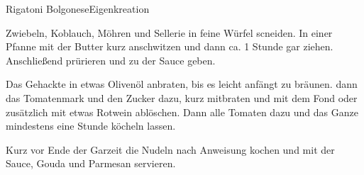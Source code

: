 \begin{recipe}{Rigatoni Bolgonese}{Eigenkreation}
  \label{Bolognese}
  \inglist

  \steps

  Zwiebeln, Koblauch, Möhren und Sellerie in feine Würfel scneiden. In einer
  Pfanne mit der Butter kurz anschwitzen und dann ca. 1 Stunde gar ziehen.
  Anschließend prürieren und zu der Sauce geben.

  Das Gehackte in etwas Olivenöl anbraten, bis es leicht anfängt zu bräunen.
  dann das Tomatenmark und den Zucker dazu, kurz mitbraten und mit dem Fond
  oder zusätzlich mit etwas Rotwein ablöschen. Dann alle Tomaten dazu und das
  Ganze mindestens eine Stunde köcheln lassen.

  Kurz vor Ende der Garzeit die Nudeln nach Anweisung kochen und mit der
  Sauce, Gouda und Parmesan servieren.
\end{recipe}
